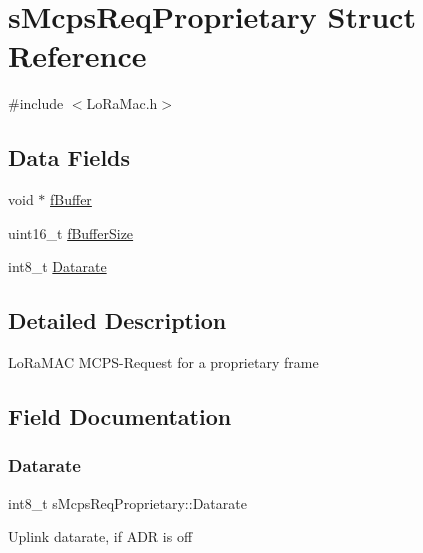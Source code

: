 \hypertarget{structsMcpsReqProprietary}{}\section{s\+Mcps\+Req\+Proprietary Struct Reference}
\label{structsMcpsReqProprietary}


{\ttfamily \#include $<$Lo\+Ra\+Mac.\+h$>$}

\subsection*{Data Fields}
\begin{DoxyCompactItemize}
\item 
void $\ast$ \hyperlink{structsMcpsReqProprietary_a374dfc00a1edb9316a451ec6fb1def34}{f\+Buffer}
\item 
uint16\+\_\+t \hyperlink{structsMcpsReqProprietary_aa0da0ddb0d1d7e78d0c0ce1e51168d68}{f\+Buffer\+Size}
\item 
int8\+\_\+t \hyperlink{structsMcpsReqProprietary_a5933662511d12917f3543a300fce8568}{Datarate}
\end{DoxyCompactItemize}


\subsection{Detailed Description}
Lo\+Ra\+M\+AC M\+C\+P\+S-\/\+Request for a proprietary frame 

\subsection{Field Documentation}
\mbox{\label{structsMcpsReqProprietary_a5933662511d12917f3543a300fce8568}} 
\subsubsection{\texorpdfstring{Datarate}{Datarate}}
{\footnotesize\ttfamily int8\+\_\+t s\+Mcps\+Req\+Proprietary\+::\+Datarate}

Uplink datarate, if A\+DR is off \mbox{\label{structsMcpsReqProprietary_a374dfc00a1edb9316a451ec6fb1def34}} 

